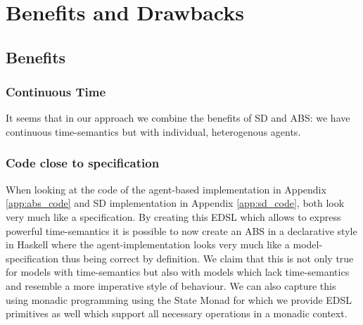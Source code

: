 \section{Benefits and Drawbacks}
\subsection{Benefits}

\subsubsection{Continuous Time}
It seems that in our approach we combine the benefits of SD and ABS: we have continuous time-semantics but with individual, heterogenous agents.

\subsubsection{Code close to specification}
When looking at the code of the agent-based implementation in Appendix \ref{app:abs_code} and SD implementation in Appendix \ref{app:sd_code}, both look very much like a specification. By creating this EDSL which allows to express powerful time-semantics it is possible to now create an ABS in a declarative style in Haskell where the agent-implementation looks very much like a model-specification thus being correct by definition.
We claim that this is not only true for models with time-semantics but also with models which lack time-semantics and resemble a more imperative style of behaviour. We can also capture this using monadic programming using the State Monad for which we provide EDSL primitives as well which support all necessary operations in a monadic context.

